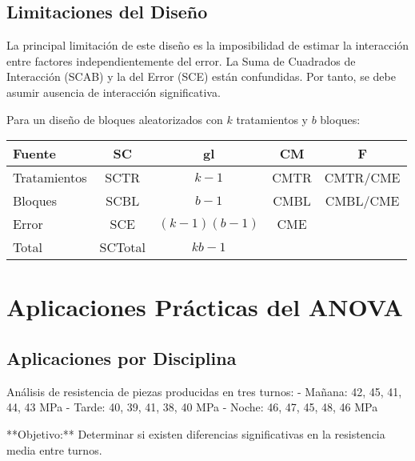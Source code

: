 \subsection{Limitaciones del Diseño}

\begin{remark}
La principal limitación de este diseño es la imposibilidad de estimar la interacción entre factores independientemente del error. La Suma de Cuadrados de Interacción (SCAB) y la del Error (SCE) están confundidas. Por tanto, se debe asumir ausencia de interacción significativa.
\end{remark}

\begin{theorem}
Para un diseño de bloques aleatorizados con $k$ tratamientos y $b$ bloques:

\begin{center}
\begin{tabular}{lcccc}
\textbf{Fuente} & \textbf{SC} & \textbf{gl} & \textbf{CM} & \textbf{F} \\
\hline
Tratamientos & SCTR & $k-1$ & CMTR & CMTR/CME \\
Bloques & SCBL & $b-1$ & CMBL & CMBL/CME \\
Error & SCE & $(k-1)(b-1)$ & CME & \\
Total & SCTotal & $kb-1$ & & \\
\end{tabular}
\end{center}
\end{theorem}

\section{Aplicaciones Prácticas del ANOVA}

\subsection{Aplicaciones por Disciplina}

\begin{example}
Análisis de resistencia de piezas producidas en tres turnos:
- Mañana: 42, 45, 41, 44, 43 MPa
- Tarde: 40, 39, 41, 38, 40 MPa  
- Noche: 46, 47, 45, 48, 46 MPa

**Objetivo:** Determinar si existen diferencias significativas en la resistencia media entre turnos.
\end{example}

